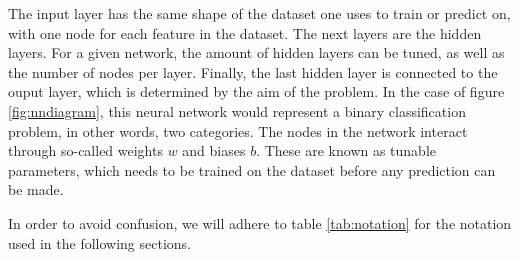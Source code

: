 The input layer has the same shape of the dataset one uses to train or predict on, with one node for each feature in the dataset.
The next layers are the hidden layers. For a given network, the amount of hidden layers can be tuned, as well as the number of 
nodes per layer. Finally, the last hidden layer is connected to the ouput layer, which is determined by the aim of the problem. 
In the case of figure \ref{fig:nndiagram}, this neural network would represent a binary classification problem, in other words, two categories. 
The nodes in the network interact through so-called weights $w$ and biases $b$. These are known as tunable parameters, 
which needs to be trained on the dataset before any prediction can be made. \par 
In order to avoid confusion, we will adhere to table \ref{tab:notation} for the notation used in the following sections.

